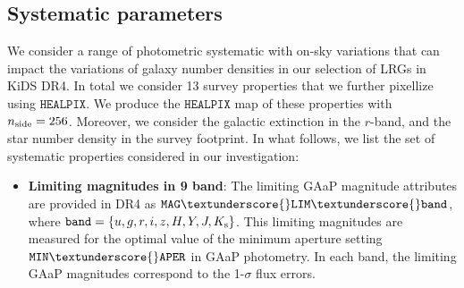 \documentclass[fleqn,usenatbib,useAMS]{mnras}
\newcommand{\healpix}{\mathtt{HEALPIX}}
\begin{document}
\subsection{Systematic parameters}

We consider a range of photometric systematic with on-sky variations that can impact the variations of galaxy number densities in our selection of LRGs in KiDS DR4. In total we consider 13 survey properties that we further pixellize using $\healpix$. We produce the $\healpix$ map of these properties with $n_{\rm side} = 256$. Moreover, we consider the galactic extinction in the $r$-band, and the star number density in the survey footprint. In what follows, we list the set of systematic properties considered in our investigation:

\begin{itemize}

  \item \textbf{Limiting magnitudes in 9 band}: The limiting GAaP magnitude attributes are provided in DR4 as $\mathtt{MAG}\textunderscore{}\mathtt{LIM}\textunderscore{} \mathtt{band}$, where $\mathtt{band} = \{u,g,r,i,z,H,Y,J,K_{\rm s}\}$. This limiting magnitudes are measured for the optimal value of the minimum aperture setting $\mathtt{MIN}\textunderscore{}\mathtt{APER}$ in GAaP photometry. In each band, the limiting GAaP magnitudes correspond to the 1-$\sigma$ flux errors. 
  

\end{itemize}
\end{document}
